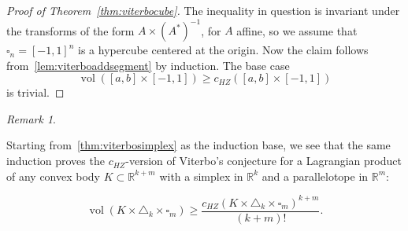 \documentclass[12pt,a4paper,oneside]{amsart}
\theoremstyle{definition}
\theoremstyle{remark}
\newtheorem{remark}[theorem]{Remark}
\newtheorem{question}[theorem]{Question}
\numberwithin{equation}{section}
\DeclareMathOperator{\volu}{vol}
\begin{document}
\begin{proof}[Proof of Theorem~\ref{thm:viterbocube}]

The inequality in question is invariant under the transforms of the form $A \times (A^*)^{-1}$, for $A$ affine, so we assume that $\square_n = [-1,1]^n$ is a hypercube centered at the origin. Now the claim follows from~\ref{lem:viterboaddsegment} by induction. The base case
$$
\volu ([a,b] \times [-1,1]) \ge c_{HZ}([a,b] \times [-1,1])
$$
is trivial.

\end{proof}

\begin{remark}
\label{rem:viterbosimplexcube}

Starting from~\ref{thm:viterbosimplex} as the induction base, we see that the same induction proves the $c_{HZ}$-version of Viterbo's conjecture for a Lagrangian product of any convex body $K \subset \mathbb{R}^{k+m}$ with a simplex in $\mathbb{R}^k$ and a parallelotope in $\mathbb{R}^m$:

$$
\volu (K \times \triangle_k \times \square_m) \ge \frac{c_{HZ}(K \times \triangle_k \times \square_m)^{k+m}}{(k+m)!}.
$$

\end{remark}
%
%



\end{document}
